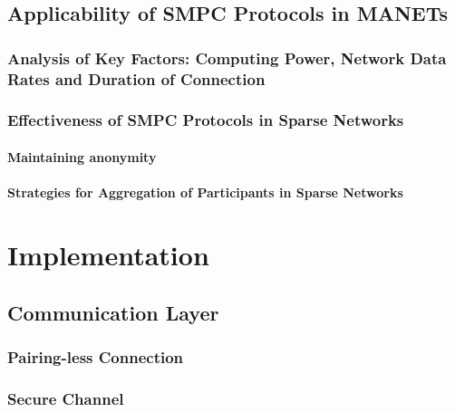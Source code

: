	\section{Applicability of \gls{SMPC} Protocols in \gls{MANET}s}
	
		\subsection*{Analysis of Key Factors: Computing Power, Network Data Rates and Duration of Connection}
		
		\subsection*{Effectiveness of \gls{SMPC} Protocols in Sparse Networks}
		
			\subsubsection*{Maintaining anonymity}
		
			\subsubsection*{Strategies for Aggregation of Participants in Sparse Networks}

\chapter{Implementation }	

	
	\section{Communication Layer}
	
			\subsection*{Pairing-less Connection}
			
			\subsection*{Secure Channel}
			
